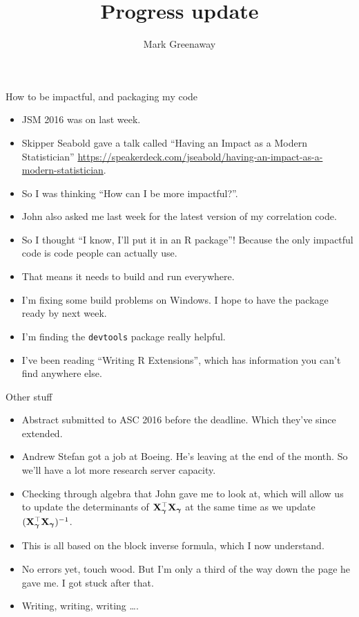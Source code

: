 \documentclass{beamer}
\title{Progress update}
\author{Mark Greenaway}
\begin{document}
\begin{frame}
\titlepage
\end{frame}

\begin{frame}{How to be impactful, and packaging my code}
\begin{itemize}
\item JSM 2016 was on last week.
\item Skipper Seabold gave a talk called ``Having an Impact as a Modern Statistician'' \url{https://speakerdeck.com/jseabold/having-an-impact-as-a-modern-statistician}.
\item So I was thinking ``How can I be more impactful?''.
\item John also asked me last week for the latest version of my correlation code.
\item So I thought ``I know, I'll put it in an R package''! Because the only impactful code is code people can
actually use.
\item That means it needs to build and run everywhere.
\item I'm fixing some build problems on Windows. I hope to have the package ready by next week.
\item I'm finding the \texttt{devtools} package really helpful.
\item I've been reading ``Writing R Extensions'', which has information you can't find anywhere else.
\end{itemize}
\end{frame}

\begin{frame}{Other stuff}
\begin{itemize}
\item Abstract submitted to ASC 2016 before the deadline. Which they've since extended.
\item Andrew Stefan got a job at Boeing. He's leaving at the end of the month. So we'll have a lot more
research server capacity.
\item Checking through algebra that John gave me to look at, which will allow us to update the determinants
of ${\bf X}_{\boldsymbol \gamma}^\top {\bf X}_{\boldsymbol \gamma}$ at the same time as we update $({\bf X}_{\boldsymbol \gamma}^\top {\bf X}_{\boldsymbol \gamma})^{-1}$.
\item This is all based on the block inverse formula, which I now understand.
\item No errors yet, touch wood. But I'm only a third of the way down the page he gave me. I got stuck after
that.
\item Writing, writing, writing \ldots.
\end{itemize}
\end{frame}
\end{document}
